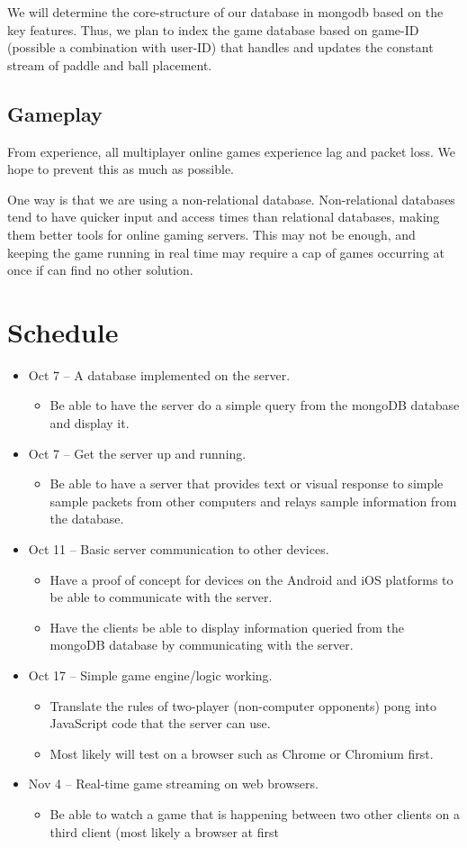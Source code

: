 \documentclass[letterpaper,12pt]{article}
\begin{document}
	We will determine the core-structure of our database in mongodb based on the key features. Thus, we plan to index the game database based on game-ID (possible a combination with user-ID) that handles and updates the constant stream of paddle and ball placement.        	
\subsection{Gameplay}
	From experience, all multiplayer online games experience lag and packet loss. We hope to prevent this as much as possible.
 
	One way is that we are using a non-relational database. Non-relational databases tend to have quicker input and access times than relational databases, making them better tools for online gaming servers. This may not be enough, and keeping the game running in real time may require a cap of games occurring at once if can find no other solution.
\section{Schedule}
\begin{itemize}
	\item Oct 7 -- A database implemented on the server.
	\begin{itemize}
		\item  Be able to have the server do a simple query from the mongoDB database and display it.
	\end{itemize}
	\item Oct 7 -- Get the server up and running. 
	\begin{itemize}
		\item Be able to have a server that provides text or visual response to simple sample packets from other computers and relays sample information from the database.
	\end{itemize}
	\item Oct 11 -- Basic server communication to other devices. 
	\begin{itemize}
		\item Have a proof of concept for devices on the Android and iOS platforms to be able to communicate with the server. 
		\item Have the clients be able to display information queried from the mongoDB database by communicating with the server.
	\end{itemize}
	\item Oct 17 -- Simple game engine/logic working.
	\begin{itemize}
		\item Translate the rules of two-player (non-computer opponents) pong into JavaScript code that the server can use.
		\item Most likely will test on a browser such as Chrome or Chromium first.
	\end{itemize}
	\item Nov 4 -- Real-time game streaming on web browsers.
	\begin{itemize}
		\item Be able to watch a game that is happening between two other clients on a third client (most likely a browser at first
	\end{itemize}
\end{itemize}
\end{document}
